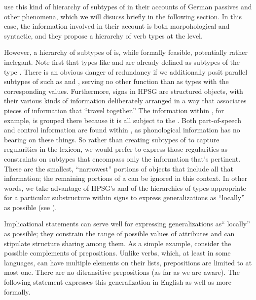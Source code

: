 \documentclass[output=paper]{langsci/langscibook}
\begin{document}
\citet{AckermanandWebelhuth1998}
 use this kind of hierarchy of subtypes of  in their accounts of German passives and other phenomena, which we will disucss briefly in the following section.
In this case, the information involved in their account is both morpohological and syntactic, and they propose a hierarchy of verb types at the  level.

However, a hierarchy of subtypes of  is, while formally feasible, potentially rather inelegant.
Note first that types like  and  are already defined as subtypes of the type .
There is an obvious danger of redundancy if we additionally posit parallel subtypes of  such as  and  , serving no other function than as types with the corresponding  values.
Furthermore, signs in HPSG are structured objects, with their various kinds of information deliberately arranged in a way that associates pieces of information that ``travel together.''
The information within , for example, is grouped there because it is all subject to the .
Both part-of-speech and control information are found within , as phonological information has no bearing on these things.
So rather than creating subtypes of  to capture regularities in the lexicon, we would prefer to express those regularities as constraints on subtypes that encompass only the information that's pertinent.
These are the smallest, ``narrowest'' portions of  objects that include all that information; the remaining portions of a  can be ignored in this context.
In other words, we take advantage of HPSG's and of the hierarchies of types appropriate for a particular substructure within signs to express generalizations as ``locally'' as possible (see ).

Implicational statements  can serve well for expressing generalizations as`` locally'' as possible; they constrain the range of possible values of attributes and can stipulate structure sharing among them.
As a simple example, consider the possible complements of prepositions.
Unlike verbs, which, at least in some languages, can have multiple elements on their  lists, prepositions are limited to at most one.
There are no ditransitive prepositions (as far as we are aware).
The following statement expresses this generalization in English as well as more formally.
\end{document}
